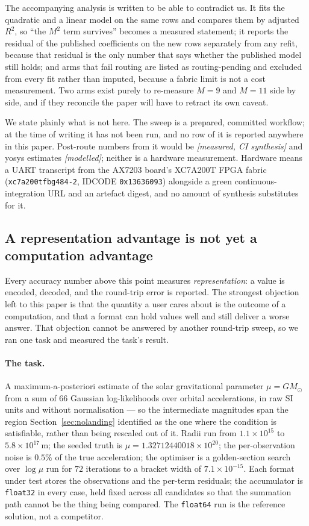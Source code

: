 \documentclass[11pt]{article}
\theoremstyle{definition}
\begin{document}
The accompanying analysis is written to be able to contradict us. It fits the
quadratic and a linear model on the same rows and compares them by adjusted
$R^2$, so ``the $M^2$ term survives'' becomes a measured statement; it reports the
residual of the published coefficients on the new rows separately from any refit,
because that residual is the only number that says whether the published model
still holds; and arms that fail routing are listed as routing-pending and
excluded from every fit rather than imputed, because a fabric limit is not a cost
measurement. Two arms exist purely to re-measure $M = 9$ and $M = 11$ side by side,
and if they reconcile the paper will have to retract its own caveat.

We state plainly what is not here. The sweep is a prepared, committed workflow;
at the time of writing it has not been run, and no row of it is reported anywhere
in this paper. Post-route numbers from it would be \emph{[measured, CI synthesis]}
and yosys estimates \emph{[modelled]}; neither is a hardware measurement. Hardware
means a UART transcript from the AX7203 board's XC7A200T FPGA fabric
(\texttt{xc7a200tfbg484-2}, IDCODE \texttt{0x13636093}) alongside a green
continuous-integration URL and an artefact digest, and no amount of synthesis
substitutes for it.

\subsection{A representation advantage is not yet a computation advantage}
\label{sec:downstream}

Every accuracy number above this point measures \emph{representation}: a value is
encoded, decoded, and the round-trip error is reported. The strongest objection
left to this paper is that the quantity a user cares about is the outcome of a
computation, and that a format can hold values well and still deliver a worse
answer. That objection cannot be answered by another round-trip sweep, so we ran
one task and measured the task's result.

\paragraph{The task.} A maximum-a-posteriori estimate of the solar gravitational
parameter $\mu = GM_{\odot}$ from a sum of $66$ Gaussian log-likelihoods over
orbital accelerations, in raw SI units and without normalisation --- so the
intermediate magnitudes span the region Section~\ref{sec:nolanding} identified as
the one where the condition is satisfiable, rather than being rescaled out of it.
Radii run from $1.1\times 10^{15}$ to $5.8\times 10^{17}$\,m; the seeded truth is
$\mu = 1.32712440018\times 10^{20}$; the per-observation noise is $0.5\%$ of the
true acceleration; the optimiser is a golden-section search over $\log\mu$ run for
$72$ iterations to a bracket width of $7.1\times 10^{-15}$. Each format under test
stores the observations and the per-term residuals; the accumulator is
\texttt{float32} in every case, held fixed across all candidates so that the
summation path cannot be the thing being compared. The
\texttt{float64} run is the reference solution, not a competitor.
\end{document}

